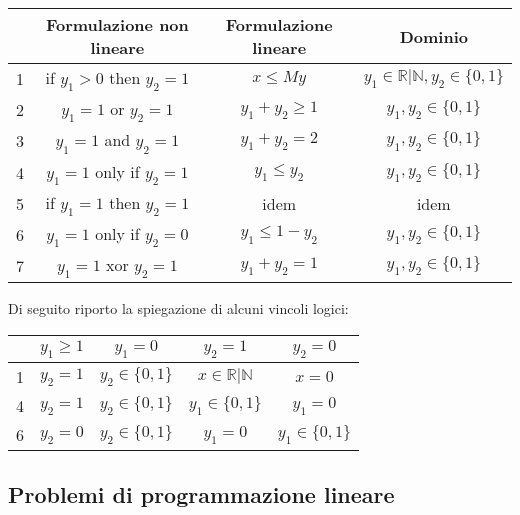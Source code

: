 \documentclass[12pt]{article}
\begin{document}
\begin{table}[H]
	\centering
	\begin{tabular}{l|c|c|c}
		  & \textbf{Formulazione non lineare} & \textbf{Formulazione lineare} & \textbf{Dominio}                           \\
		\hline
		1 & if $y_1 > 0$ then $y_2 = 1$       & $x \leq My$                   & $y_1 \in \mathbb{R | N}, y_2 \in \{0, 1\}$ \\
		2 & $y_1 = 1$ or $y_2 = 1$            & $y_1 + y_2 \geq 1$            & $y_1, y_2 \in \{0, 1\}$                    \\
		3 & $y_1 = 1$ and $y_2 = 1$           & $y_1 + y_2 = 2$               & $y_1, y_2 \in \{0, 1\}$                    \\
		4 & $y_1 = 1$ only if $y_2 = 1$       & $y_1 \leq y_2$                & $y_1, y_2 \in \{0, 1\}$                    \\
		5 & if $y_1 = 1$ then $y_2 = 1$       & idem                          & idem                                       \\
		6 & $y_1 = 1$ only if $y_2 = 0$       & $y_1 \leq 1 - y_2$            & $y_1, y_2 \in \{0, 1\}$                    \\
		7 & $y_1 = 1$ xor $y_2 = 1$           & $y_1 + y_2 = 1$               & $y_1, y_2 \in \{0, 1\}$                    \\
	\end{tabular}
\end{table}

Di seguito riporto la spiegazione di alcuni vincoli logici:
\begin{table}[H]
	\centering
	\begin{tabular}{l|c|c|c|c}
		  & $y_1 \geq 1$ & $y_1 = 0$          & $y_2 = 1$              & $y_2 = 0$          \\
		\hline
		1 & $y_2 = 1$    & $y_2 \in \{0, 1\}$ & $x \in \mathbb{R | N}$ & $x = 0$            \\
		4 & $y_2 = 1$    & $y_2 \in \{0, 1\}$ & $y_1 \in \{0, 1\}$     & $y_1 = 0$          \\
		6 & $y_2 = 0$    & $y_2 \in \{0, 1\}$ & $y_1 = 0$              & $y_1 \in \{0, 1\}$ \\
	\end{tabular}
\end{table}

\subsection{Problemi di programmazione lineare}
\end{document}
